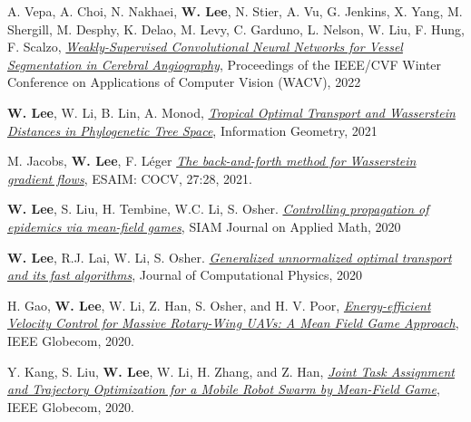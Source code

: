\begin{cvparagraph}
\begin{cvitems}
    \medskip
    \item A. Vepa, A. Choi, N. Nakhaei, \textbf{W. Lee}, N. Stier, A. Vu, G. Jenkins, X. Yang, M. Shergill, M. Desphy, K. Delao, M. Levy, C. Garduno, L. Nelson, W. Liu, F. Hung, F. Scalzo, \href{https://openaccess.thecvf.com/content/WACV2022/html/Vepa_Weakly-Supervised_Convolutional_Neural_Networks_for_Vessel_Segmentation_in_Cerebral_Angiography_WACV_2022_paper.html}{\textit{Weakly-Supervised Convolutional Neural Networks for Vessel Segmentation in Cerebral Angiography}}, Proceedings of the IEEE/CVF Winter Conference on Applications of Computer Vision (WACV), 2022
    \medskip
    \item \textbf{W. Lee}, W. Li, B. Lin, A. Monod, \href{https://arxiv.org/pdf/1911.05401v1.pdf}{\textit{Tropical Optimal Transport and Wasserstein Distances in Phylogenetic Tree Space}}, {Information Geometry}, 2021
    \medskip
    \item M. Jacobs, \textbf{W. Lee}, F. Léger \href{https://arxiv.org/pdf/2011.08151}{\textit{The back-and-forth method for Wasserstein gradient flows}}, {ESAIM: COCV}, 27:28, 2021.
    \medskip
    \item \textbf{W. Lee}, S. Liu, H. Tembine, W.C. Li, S. Osher. \href{https://www.researchgate.net/publication/341804278_Controlling_Propagation_of_epidemics_via_mean-field_games}{\textit{Controlling propagation of epidemics via mean-field games}}, {SIAM Journal on Applied Math}, 2020
    \medskip
    \item \textbf{W. Lee}, R.J. Lai, W. Li, S. Osher. \href{https://www.researchgate.net/publication/338990122_Generalized_Unnormalized_Optimal_Transport_and_its_fast_algorithms}{\textit{Generalized unnormalized optimal transport and its fast algorithms}}, {Journal of Computational Physics}, 2020
    \medskip
    \item H. Gao, \textbf{W. Lee}, W. Li, Z. Han, S. Osher, and H. V. Poor, \href{ftp://ftp.math.ucla.edu/pub/camreport/cam19-57.pdf}{\textit{Energy-efficient Velocity Control for Massive Rotary-Wing UAVs: A Mean Field Game Approach}}, {IEEE Globecom}, 2020.
    \medskip
    \item Y. Kang, S. Liu, \textbf{W. Lee}, W. Li, H. Zhang, and Z. Han, \href{https://ieeexplore.ieee.org/document/9322422}{\textit{Joint Task Assignment and Trajectory Optimization for a Mobile Robot Swarm by Mean-Field Game}}, {IEEE Globecom}, 2020.
  \end{cvitems}

\vspace{0.5cm}
\end{cvparagraph}